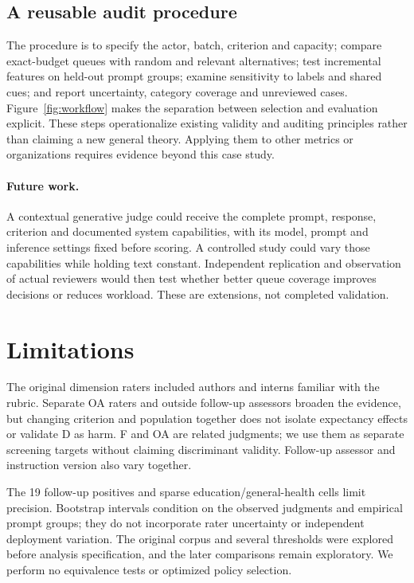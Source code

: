 \subsection{A reusable audit procedure}\label{sec:protocol}
The procedure is to specify the actor, batch, criterion and capacity; compare exact-budget queues with random and relevant alternatives; test incremental features on held-out prompt groups; examine sensitivity to labels and shared cues; and report uncertainty, category coverage and unreviewed cases. Figure~\ref{fig:workflow} makes the separation between selection and evaluation explicit. These steps operationalize existing validity and auditing principles rather than claiming a new general theory. Applying them to other metrics or organizations requires evidence beyond this case study.

\paragraph{Future work.}\label{sec:future}
A contextual generative judge could receive the complete prompt, response, criterion and documented system capabilities, with its model, prompt and inference settings fixed before scoring. A controlled study could vary those capabilities while holding text constant. Independent replication and observation of actual reviewers would then test whether better queue coverage improves decisions or reduces workload. These are extensions, not completed validation.

\section{Limitations}
The original dimension raters included authors and interns familiar with the rubric. Separate OA raters and outside follow-up assessors broaden the evidence, but changing criterion and population together does not isolate expectancy effects or validate D as harm. F and OA are related judgments; we use them as separate screening targets without claiming discriminant validity. Follow-up assessor and instruction version also vary together.

The 19 follow-up positives and sparse education/general-health cells limit precision. Bootstrap intervals condition on the observed judgments and empirical prompt groups; they do not incorporate rater uncertainty or independent deployment variation. The original corpus and several thresholds were explored before analysis specification, and the later comparisons remain exploratory. We perform no equivalence tests or optimized policy selection.

